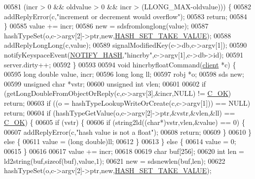 \begin{DoxyCode}
00581         (incr > 0 && oldvalue > 0 && incr > (LLONG\_MAX-oldvalue))) \{
00582         addReplyError(c,\textcolor{stringliteral}{"increment or decrement would overflow"});
00583         \textcolor{keywordflow}{return};
00584     \}
00585     value += incr;
00586     \textcolor{keyword}{new} = sdsfromlonglong(value);
00587     hashTypeSet(o,c->argv[2]->ptr,\textcolor{keyword}{new},\hyperlink{server_8h_a6835ddf42816b819b74a677170d6f304}{HASH\_SET\_TAKE\_VALUE});
00588     addReplyLongLong(c,value);
00589     signalModifiedKey(c->db,c->argv[1]);
00590     notifyKeyspaceEvent(\hyperlink{server_8h_afe25ae13417e6fa5011e7efc69a34bc0}{NOTIFY\_HASH},\textcolor{stringliteral}{"hincrby"},c->argv[1],c->db->id);
00591     server.dirty++;
00592 \}
00593 
00594 \textcolor{keywordtype}{void} hincrbyfloatCommand(\hyperlink{structclient}{client} *c) \{
00595     \textcolor{keywordtype}{long} \textcolor{keywordtype}{double} value, incr;
00596     \textcolor{keywordtype}{long} \textcolor{keywordtype}{long} ll;
00597     robj *o;
00598     sds \textcolor{keyword}{new};
00599     \textcolor{keywordtype}{unsigned} \textcolor{keywordtype}{char} *vstr;
00600     \textcolor{keywordtype}{unsigned} \textcolor{keywordtype}{int} vlen;
00601 
00602     \textcolor{keywordflow}{if} (getLongDoubleFromObjectOrReply(c,c->argv[3],&incr,NULL) != \hyperlink{server_8h_a303769ef1065076e68731584e758d3e1}{C\_OK}) \textcolor{keywordflow}{return};
00603     \textcolor{keywordflow}{if} ((o = hashTypeLookupWriteOrCreate(c,c->argv[1])) == NULL) \textcolor{keywordflow}{return};
00604     \textcolor{keywordflow}{if} (hashTypeGetValue(o,c->argv[2]->ptr,&vstr,&vlen,&ll) == \hyperlink{server_8h_a303769ef1065076e68731584e758d3e1}{C\_OK}) \{
00605         \textcolor{keywordflow}{if} (vstr) \{
00606             \textcolor{keywordflow}{if} (string2ld((\textcolor{keywordtype}{char}*)vstr,vlen,&value) == 0) \{
00607                 addReplyError(c,\textcolor{stringliteral}{"hash value is not a float"});
00608                 \textcolor{keywordflow}{return};
00609             \}
00610         \} \textcolor{keywordflow}{else} \{
00611             value = (\textcolor{keywordtype}{long} \textcolor{keywordtype}{double})ll;
00612         \}
00613     \} \textcolor{keywordflow}{else} \{
00614         value = 0;
00615     \}
00616 
00617     value += incr;
00618 
00619     \textcolor{keywordtype}{char} buf[256];
00620     \textcolor{keywordtype}{int} len = ld2string(buf,\textcolor{keyword}{sizeof}(buf),value,1);
00621     \textcolor{keyword}{new} = sdsnewlen(buf,len);
00622     hashTypeSet(o,c->argv[2]->ptr,\textcolor{keyword}{new},\hyperlink{server_8h_a6835ddf42816b819b74a677170d6f304}{HASH\_SET\_TAKE\_VALUE});

\end{DoxyCode}
